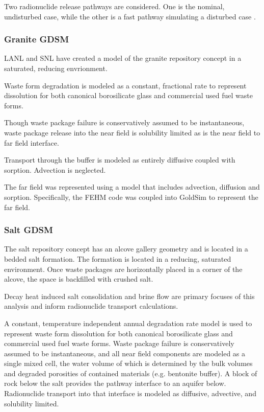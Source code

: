 {Two radionuclide release pathways are considered. One is the nominal, undisturbed 
case, while the other is a fast pathway simulating a disturbed case
\cite{clayton_generic_2011}.


\subsubsection{Granite GDSM}

\gls{LANL} and \gls{SNL} have created a model of the granite repository concept  
in a saturated, reducing envrionment.

Waste form degradation is modeled as a constant, fractional rate to represent 
dissolution for both canonical borosilicate glass and commercial used fuel 
waste forms.  

Though waste package failure is conservatively assumed to be instantaneous,
waste package release into the near field is solubility limited as is the near 
field to far field interface. 

Transport through the buffer is modeled as entirely diffusive coupled with 
sorption. Advection is neglected.

The far field was represented using a model that includes advection, diffusion 
and sorption. Specifically, the \gls{FEHM} code was coupled into GoldSim to 
represent the far field.

\subsubsection{Salt GDSM}

The salt repository concept has an alcove gallery geometry and is located in a 
bedded salt formation. The formation is located in a reducing, saturated 
environment. Once waste packages  are horizontally placed in a corner of the 
alcove, the space is backfilled with crushed salt. 

Decay heat induced salt consolidation and brine flow are primary focuses of 
this analysis and inform radionuclide transport calculations. 

A constant, temperature independent annual degradation rate model is used to 
represent waste form dissolution for both canonical borosilicate glass and 
commercial used fuel waste forms. Waste package failure is conservatively 
assumed to be instantaneous, and all near field components are modeled as a 
single mixed cell, the water volume of which is determined by the bulk volumes 
and degraded porosities of contained materials (e.g. bentonite buffer). A block  
of rock below the salt provides the pathway interface to an aquifer below. 
Radionuclide transport into that interface is modeled as diffusive, advective, and 
solubility limited.

}
